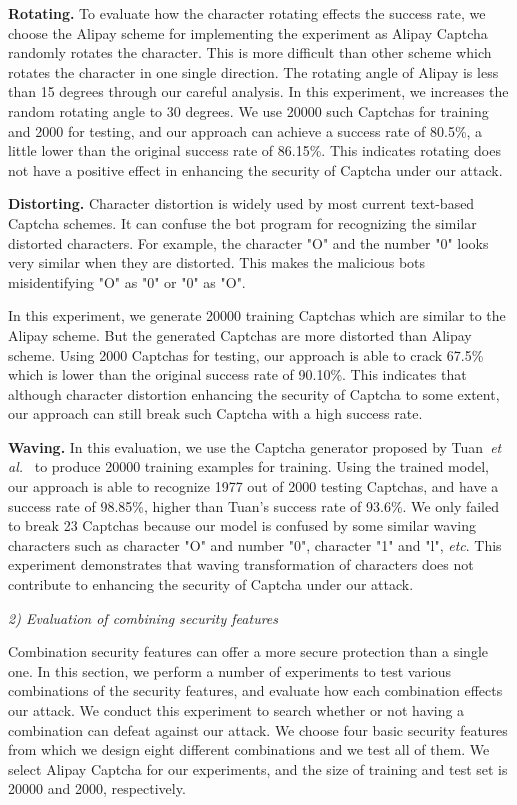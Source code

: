 \textbf{Rotating.} To evaluate how the character rotating effects the success rate, we choose the Alipay scheme for implementing the experiment as Alipay Captcha randomly rotates the character. This is more difficult than other scheme which rotates the character in one single direction. The rotating angle of Alipay is less than 15 degrees through our careful analysis. In this experiment, we increases the random rotating angle to 30 degrees. We use 20000 such Captchas for training and 2000 for testing, and our approach can achieve a success rate of 80.5\%, a little lower than the original success rate of 86.15\%. This indicates rotating does not have a positive effect in enhancing the security of Captcha under our attack.

\textbf{Distorting.} Character distortion is widely used by most current text-based Captcha schemes. It can confuse the bot program for recognizing the similar distorted characters. For example, the character "O" and the number "0" looks very similar when they are distorted. This makes the malicious bots misidentifying "O" as "0" or "0" as "O".

In this experiment, we generate 20000 training Captchas which are similar to the Alipay scheme. But the generated Captchas are more distorted than Alipay scheme. Using 2000 Captchas for testing, our approach is able to crack 67.5\% which is lower than the original success rate of 90.10\%. This indicates that although character distortion enhancing the security of Captcha to some extent, our approach can still break such Captcha with a high success rate.

\textbf{Waving.} In this evaluation, we use the Captcha generator proposed by Tuan~\emph{et al.}~\cite{Le2017Using} to produce 20000 training examples for training. Using the trained model, our approach is able to recognize 1977 out of 2000 testing Captchas, and have a success rate of 98.85\%, higher than Tuan's success rate of 93.6\%. We only failed to break 23 Captchas because our model is confused by some similar waving characters such as character "O" and number "0", character "1" and "l", \emph{etc}.  This experiment demonstrates that waving transformation of characters does not contribute to enhancing the security of Captcha under our attack.


\noindent \emph{2) Evaluation of combining security features}

Combination security features can offer a more secure protection than a single one. In this section, we perform a number of experiments to test various combinations of the security features, and evaluate how each combination effects our attack. We conduct this experiment to search whether or not having a combination can defeat against our attack. We choose four basic security features from which we design eight different combinations and we test all of them. We select Alipay Captcha for our experiments, and the size of training and test set is 20000 and 2000, respectively. 

